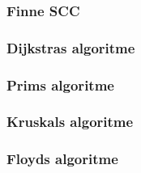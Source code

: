 \subsubsection{\color{red}Finne SCC}

\subsubsection{\color{red}Dijkstras algoritme}
\label{dijkstra}

\subsubsection{\color{red}Prims algoritme}
\label{prim}

\subsubsection{\color{red}Kruskals algoritme}
\label{kruskal}

\subsubsection{\color{red}Floyds algoritme}
\label{floyd}
